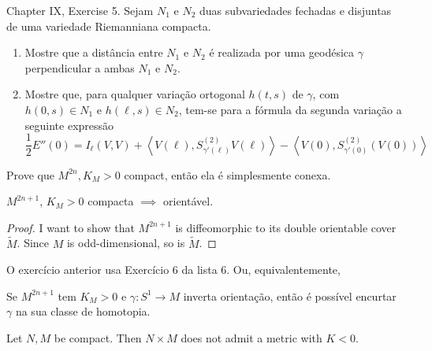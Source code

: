 \begin{exercise}
\label{exercise-two-submanifolds}
\cite{doc} Chapter IX, Exercise 5. Sejam $N_1$ e $N_2$ duas subvariedades fechadas e disjuntas de uma variedade
Riemanniana compacta.
\begin{enumerate}
\item Mostre que a distância entre $N_1$ e $N_2$ é realizada por uma geodésica
	$\gamma$ perpendicular a ambas $N_1$ e $N_2$.
\item Mostre que, para qualquer variação ortogonal $h(t,s)$ de $\gamma$, com
$h(0,s) \in N_1$ e $h(\ell,s) \in N_2$, tem-se para a fórmula da segunda
variação a seguinte expressão
$$
\frac{1}{2}E''(0)=I_{\ell}(V,V)+
\left<V(\ell),S_{\gamma'(\ell)}^{(2)}V(\ell)\right>
-\left<V(0),S^{(2)}_{\gamma'(0)}(V(0))\right>
$$
\end{enumerate}
\end{exercise}

\begin{exercise}
\label{exercise-even-dimension-positive-K-compact-is-simply-connected}
Prove que $M^{2n},K_M>0$ compact, então ela é simplesmente conexa.
\end{exercise}

\begin{exercise}
\label{exercise-odd-dimension-positive-K-is-orientable}
$M^{2n+1}$, $K_M>0$ compacta \(\implies\) orientável.
\end{exercise}

\begin{proof}
I want to show that $M^{2n+1}$ is diffeomorphic to its double orientable cover
 $\tilde{M}$. Since $M$ is odd-dimensional, so is $\tilde{M}$. 
\end{proof}

O exercício anterior usa Exercício 6 da lista 6. Ou, equivalentemente,

\begin{exercise}
\label{exercise-inverts-orientation-shortened}
Se $M^{2n+1}$ tem $K_M >0$ e $\gamma:S^1 \to M$ inverta orientação, então é
possível encurtar $\gamma$ na sua classe de homotopia.
\end{exercise}

\begin{exercise}
\label{exercise-product-of-compact-does-not-admit-negative-curvature}
Let $N,M$ be compact. Then $N \times M$ does not admit a metric with $K<0$.
\end{exercise}

